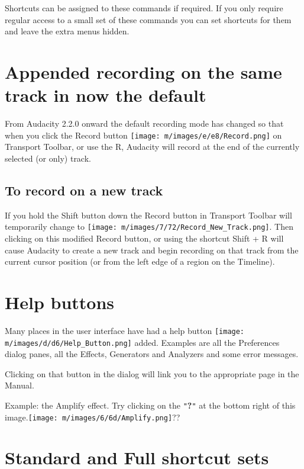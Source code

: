 Shortcuts can be assigned to these commands if required.
If you only require regular access to a small set of these commands you can set shortcuts for them and leave the extra menus hidden.


\section{Appended recording on the same track in now the default}


From Audacity 2.2.0 onward the default recording mode has changed so that when you click the Record button \texttt{[image: m/images/e/e8/Record.png]} on Transport Toolbar, or use the R, Audacity will record at the end of the currently selected (or only) track.

\subsection{To record on a new track}


If you hold the Shift button down the Record button in Transport Toolbar will temporarily change to \texttt{[image: m/images/7/72/Record\_New\_Track.png]}. Then clicking on this modified Record button, or using the shortcut Shift + R will cause Audacity to create a new track and begin recording on that track from the current cursor position (or from the left edge of a region on the Timeline). 


\section{Help buttons}


Many places in the user interface have had a help button \texttt{[image: m/images/d/d6/Help\_Button.png]} added. Examples are all the Preferences dialog panes, all the Effects, Generators and Analyzers and some error messages.

Clicking on that button in the dialog will link you to the appropriate page in the Manual.

Example: the Amplify effect.  Try clicking on the \texttt{{}"{}}\textbf{?}\texttt{{}"{}} at the bottom right of this image.\texttt{[image: m/images/6/6d/Amplify.png]}??


\section{Standard and Full shortcut sets}


